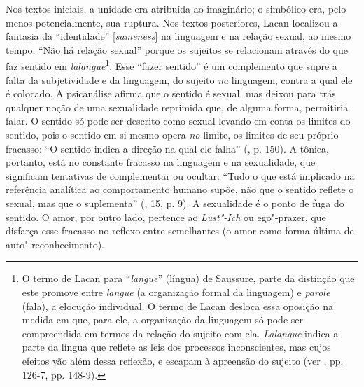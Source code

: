 Nos textos iniciais, a unidade era atribuída ao imaginário; o simbólico
era, pelo menos potencialmente, sua ruptura. Nos textos posteriores,
Lacan localizou a fantasia da ``identidade'' {[}\emph{sameness}{]} na
linguagem e na relação sexual, ao mesmo tempo. ``Não há relação sexual''
porque os sujeitos se relacionam através do que faz sentido em
\emph{lalangue}\footnote{O termo de Lacan para ``\emph{langue}''
  (língua) de Saussure, parte da distinção que este promove entre
  \emph{langue} (a organização formal da linguagem) e \emph{parole}
  (fala), a elocução individual. O termo de Lacan desloca essa oposição
  na medida em que, para ele, a organização da linguagem só pode ser
  compreendida em termos da relação do sujeito com ela. \emph{Lalangue}
  indica a parte da língua que reflete as leis dos processos
  inconscientes, mas cujos efeitos vão além dessa reflexão, e escapam à
  apreensão do sujeito (ver , pp. 126-7, pp. 148-9).}. Esse ``fazer
sentido'' é um complemento que supre a falta da subjetividade e da
linguagem, do sujeito \emph{na} linguagem, contra a qual ele é colocado.
A psicanálise afirma que o sentido é sexual, mas deixou para trás
qualquer noção de uma sexualidade reprimida que, de alguma forma,
permitiria falar. O sentido só pode ser descrito como sexual levando em
conta os limites do sentido, pois o sentido em si mesmo opera \emph{no}
limite, os limites de seu próprio fracasso: ``O sentido indica a direção
na qual ele falha'' (, p. 150). A tônica, portanto, está no
constante fracasso na linguagem e na sexualidade, que significam
tentativas de complementar ou ocultar: ``Tudo o que está implicado na
referência analítica ao comportamento humano supõe, não que o sentido
reflete o sexual, mas que o suplementa'' (, 15, p. 9). A sexualidade
é o ponto de fuga do sentido. O amor, por outro lado, pertence ao
\emph{Lust"-Ich} ou ego"-prazer, que disfarça esse fracasso no reflexo
entre semelhantes (o amor como forma última de auto"-reconhecimento).

